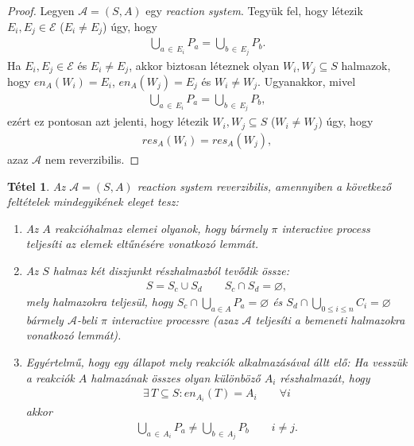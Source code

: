 \documentclass[12pt]{article}
\theoremstyle{definition}
\theoremstyle{remark}
\theoremstyle{plain}
\newtheorem*{theorem*}{Tétel}
\theoremstyle{plain}
\let\emptyset\varnothing
\newcommand{\en}{\textit{en}}
\newcommand{\res}{\textit{res}}
\begin{document}
    \begin{proof}
        Legyen $\mathscr{A} = (S, A)$ egy \textit{reaction system}. Tegyük fel, hogy létezik $E_{i}, E_{j} \in \mathcal{E}$ ($E_{i} \neq E_{j}$) úgy, hogy
        \begin{align*}
            \bigcup\limits_{a \,\in\, E_{i}} P_{a} = \bigcup\limits_{b \,\in\, E_{j}} P_{b}.
        \end{align*}
        Ha $E_{i}, E_{j} \in \mathcal{E}$ és $E_{i} \neq E_{j}$, akkor biztosan léteznek olyan $W_{i}, W_{j} \subseteq S$ halmazok, hogy $\en_{A}(W_{i}) = E_{i}$, $\en_{A}(W_{j}) = E_{j}$ és $W_{i} \neq W_{j}$. Ugyanakkor, mivel
        \begin{align*}
            \bigcup\limits_{a \,\in\, E_{i}} P_{a} = \bigcup\limits_{b \,\in\, E_{j}} P_{b},
        \end{align*}
        ezért ez pontosan azt jelenti, hogy létezik $W_{i}, W_{j} \subseteq S$ ($W_{i} \neq W_{j}$) úgy, hogy
        \begin{align*}
            \res_{A}(W_{i}) = \res_{A}(W_{j}),
        \end{align*}
        azaz $\mathscr{A}$ nem reverzibilis.
    \end{proof}

    \begin{theorem*}
        Az $\mathscr{A} = (S, A)$ \textit{reaction system} reverzibilis, amennyiben a következő feltételek mindegyikének eleget tesz:
        \begin{enumerate}[label={(\arabic*)}]
            \item
            Az $A$ reakcióhalmaz elemei olyanok, hogy bármely $\pi$ \textit{interactive process} teljesíti az elemek eltűnésére vonatkozó lemmát.

            \item
            Az $S$ halmaz két diszjunkt részhalmazból tevődik össze:
            \begin{align*}
                S = S_{c} \cup S_{d} \qquad S_{c} \cap S_{d} = \emptyset,
            \end{align*}
            mely halmazokra teljesül, hogy $S_{c} \cap \bigcup_{a \in A} P_{a} = \emptyset$ és $S_{d} \cap \bigcup_{0 \leq i \leq n} C_{i} = \emptyset$ bármely $\mathscr{A}$-beli $\pi$ \textit{interactive processre} (azaz $\mathscr{A}$ teljesíti a bemeneti halmazokra vonatkozó lemmát).

            \item
            Egyértelmű, hogy egy állapot mely reakciók alkalmazásával állt elő: Ha vesszük a reakciók $A$ halmazának összes olyan különböző $A_i$ részhalmazát, hogy
            \begin{align*}
                \exists \, T \subseteq S : \en_{A_{i}}(T) = A_{i} \qquad \forall i
            \end{align*}
            akkor
            \begin{align*}
                \bigcup\limits_{a \,\in\, A_{i}} P_{a} \neq \bigcup\limits_{b \,\in\, A_{j}} P_{b} \qquad i \neq j.
            \end{align*}
        \end{enumerate}
    \end{theorem*}
\end{document}
